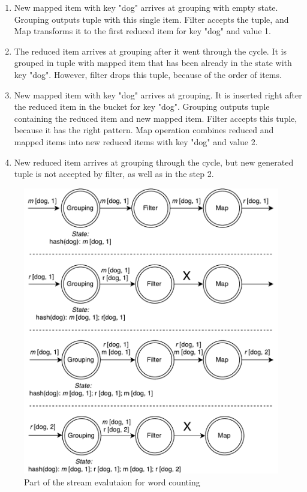 \begin{enumerate}
    \item New mapped item with key "dog" arrives at grouping with empty state. Grouping outputs tuple with this single item. Filter accepts the tuple, and Map transforms it to the first reduced item for key "dog" and value 1.
    \item The reduced item arrives at grouping after it went through the cycle. It is grouped in tuple with mapped item that has been already in the state with key "dog". However, filter drops this tuple, because of the order of items.
    \item New mapped item with key "dog" arrives at grouping. It is inserted right after the reduced item in the bucket for key "dog". Grouping outputs tuple containing the reduced item and new mapped item. Filter accepts this tuple, because it has the right pattern. Map operation combines reduced and mapped items into new reduced items with key "dog" and value 2.
    \item New reduced item arrives at grouping through the cycle, but new generated tuple is not accepted by filter, as well as in the step 2.
\end{enumerate}

\begin{figure}[htb]
  \centering
  \includegraphics[scale=0.5]{pics/wordcount}
  \caption{Part of the stream evalutaion for word counting}
  \label {word-count-figure}
\end{figure}

